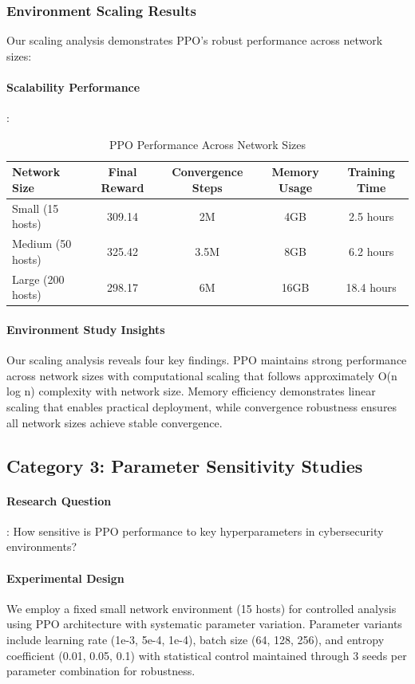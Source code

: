 \documentclass[12pt,oneside]{article}
\begin{document}
\subsubsection{Environment Scaling Results}

Our scaling analysis demonstrates PPO's robust performance across network sizes:

\paragraph{Scalability Performance}:
\begin{table}[H]
\centering
\caption{PPO Performance Across Network Sizes}
\begin{tabular}{|l|c|c|c|c|}
\hline
\textbf{Network Size} & \textbf{Final Reward} & \textbf{Convergence Steps} & \textbf{Memory Usage} & \textbf{Training Time} \\
\hline
Small (15 hosts) & 309.14 & 2M & 4GB & 2.5 hours \\
Medium (50 hosts) & 325.42 & 3.5M & 8GB & 6.2 hours \\  
Large (200 hosts) & 298.17 & 6M & 16GB & 18.4 hours \\
\hline
\end{tabular}
\end{table}
\clearpage

\paragraph{Environment Study Insights} Our scaling analysis reveals four key findings. PPO maintains strong performance across network sizes with computational scaling that follows approximately O(n log n) complexity with network size. Memory efficiency demonstrates linear scaling that enables practical deployment, while convergence robustness ensures all network sizes achieve stable convergence.

\subsection{Category 3: Parameter Sensitivity Studies}

\paragraph{Research Question}: How sensitive is PPO performance to key hyperparameters in cybersecurity environments?

\paragraph{Experimental Design} We employ a fixed small network environment (15 hosts) for controlled analysis using PPO architecture with systematic parameter variation. Parameter variants include learning rate (1e-3, 5e-4, 1e-4), batch size (64, 128, 256), and entropy coefficient (0.01, 0.05, 0.1) with statistical control maintained through 3 seeds per parameter combination for robustness.
\end{document}
